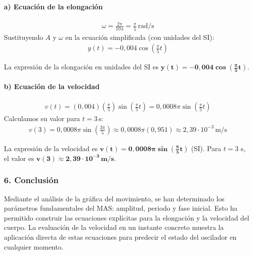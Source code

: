 \paragraph{a) Ecuación de la elongación}
\begin{gather}
    \omega = \frac{2\pi}{10\,\text{s}} = \frac{\pi}{5}\,\text{rad/s}
\end{gather}
Sustituyendo $A$ y $\omega$ en la ecuación simplificada (con unidades del SI):
\begin{gather}
    y(t) = -0,004 \cos\left(\frac{\pi}{5} t\right)
\end{gather}
\begin{cajaresultado}
    La expresión de la elongación en unidades del SI es $\boldsymbol{y(t) = -0,004 \cos\left(\frac{\pi}{5} t\right)}$.
\end{cajaresultado}

\paragraph{b) Ecuación de la velocidad}
\begin{gather}
    v(t) = (0,004) \left(\frac{\pi}{5}\right) \sin\left(\frac{\pi}{5} t\right) = 0,0008\pi \sin\left(\frac{\pi}{5} t\right)
\end{gather}
Calculamos su valor para $t=3\,\text{s}$:
\begin{gather}
    v(3) = 0,0008\pi \sin\left(\frac{3\pi}{5}\right) \approx 0,0008\pi (0,951) \approx 2,39 \cdot 10^{-3}\,\text{m/s}
\end{gather}
\begin{cajaresultado}
    La expresión de la velocidad es $\boldsymbol{v(t) = 0,0008\pi \sin\left(\frac{\pi}{5} t\right)}$ (SI).
    Para $t=3$ s, el valor es $\boldsymbol{v(3) \approx 2,39 \cdot 10^{-3}\,\textbf{m/s}}$.
\end{cajaresultado}

\subsubsection*{6. Conclusión}
\begin{cajaconclusion}
Mediante el análisis de la gráfica del movimiento, se han determinado los parámetros fundamentales del MAS: amplitud, periodo y fase inicial. Esto ha permitido construir las ecuaciones explícitas para la elongación y la velocidad del cuerpo. La evaluación de la velocidad en un instante concreto muestra la aplicación directa de estas ecuaciones para predecir el estado del oscilador en cualquier momento.
\end{cajaconclusion}

